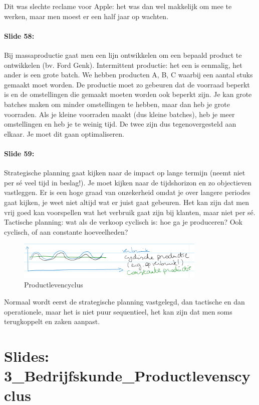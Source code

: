 \documentclass[10pt,a4paper]{report}
\begin{document}
Dit was slechte reclame voor Apple: het was dan wel makkelijk om mee te werken, maar men moest er een half jaar op wachten.

\paragraph{Slide 58:} Bij massaproductie gaat men een lijn ontwikkelen om een bepaald product te ontwikkelen (bv. Ford Genk). Intermittent productie: het een is eenmalig, het ander is een grote batch. We hebben producten A, B, C waarbij een aantal stuks gemaakt moet worden. De productie moet zo gebeuren dat de voorraad beperkt is en de omstellingen die gemaakt moeten worden ook beperkt zijn. Je kan grote batches maken om minder omstellingen te hebben, maar dan heb je grote voorraden. Als je kleine voorraden maakt (dus kleine batches), heb je meer omstellingen en heb je te weinig tijd. De twee zijn dus tegenovergesteld aan elkaar. Je moet dit gaan optimaliseren.

\paragraph{Slide 59:} Strategische planning gaat kijken naar de impact op lange termijn (neemt niet per s\'e veel tijd in beslag!). Je moet kijken naar de tijdshorizon en zo objectieven vastleggen. Er is een hoge graad van onzekerheid omdat je over langere periodes gaat kijken, je weet niet altijd wat er juist gaat gebeuren. Het kan zijn dat men vrij goed kan voorspellen wat het verbruik gaat zijn bij klanten, maar niet per s\'e.\\
Tactische planning: wat als de verkoop cyclisch is: hoe ga je produceren? Ook cyclisch, of aan constante hoeveelheden?


\begin{figure}[h!]
\centering
\includegraphics[width=90mm]{Les2_02.png}
\caption{Productlevencyclus} 
\label{les1_02}
\end{figure}


Normaal wordt eerst de strategische planning vastgelegd, dan tactische en dan operationele, maar het is niet puur sequentieel, het kan zijn dat men soms terugkoppelt en zaken aanpast.

\section{Slides: 3\_Bedrijfskunde\_Productlevenscyclus}
\end{document}
